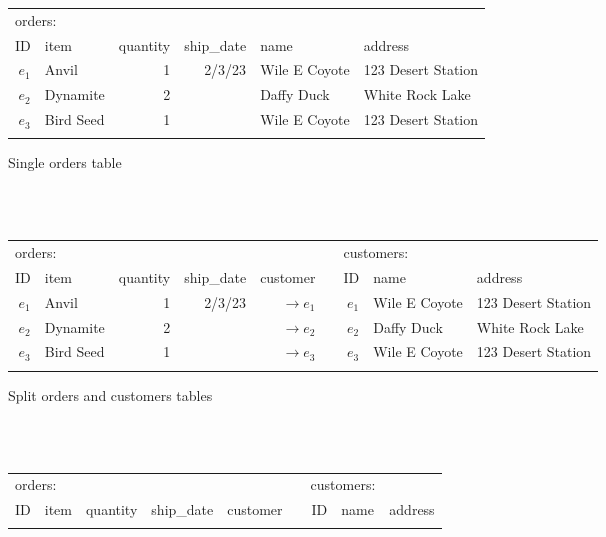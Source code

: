 \documentclass[english,submission]{programming}
\theoremstyle{definition}
\begin{document}
\begin{figure}
  \vspace{-8pt}
\begin{subfigure}[b]{35em}\vspace{0pt}
  \sffamily
  \small
  \begin{tabular}{ r|l|r|r|l|l|}
  \multicolumn{2}{l}{orders:}\\
     \hhline{~-----}
     ID & item & quantity & ship\_date & name & address \\
     \hhline{~=====}

     $e_1$ & Anvil & 1 & 2/3/23 & Wile E Coyote & 123 Desert Station \\
     \hhline{~-----}
     $e_2$ & Dynamite & 2 & & Daffy Duck & White Rock Lake \\
     \hhline{~-----}
     $e_3$ & Bird Seed & 1 & & Wile E Coyote & 123 Desert Station \\
     \hhline{~-----}
  \end{tabular}
  \caption{Single orders table}
  \label{fig:tables-single}
\end{subfigure}
\\[-0.5em]~\\
\begin{subfigure}[b]{40em}\vspace{0pt}
  \sffamily
  \small
  \begin{tabular}{ r|l|r|r|r|cr|l|l|}
  \multicolumn{2}{l}{orders:}&\multicolumn{4}{l}{}&\multicolumn{2}{l}{customers:}\\
     \hhline{~----~~--}
     ID & item & quantity & ship\_date & customer && ID & name & address \\
     \hhline{~====~~==}

     $e_1$ & Anvil & 1 & 2/3/23 & $\rightarrow\!e_1$ && $e_1$ & Wile E Coyote & 123 Desert Station \\
     \hhline{~----~~--}
     $e_2$ & Dynamite & 2 & & $\rightarrow\!e_2$ && $e_2$ & Daffy Duck & White Rock Lake \\
     \hhline{~----~~--}
     $e_3$ & Bird Seed & 1 & & $\rightarrow\!e_3$ && $e_3$ & Wile E Coyote & 123 Desert Station \\
     \hhline{~----~~--}
  \end{tabular}
  \caption{Split orders and customers tables}
  \label{fig:tables-split}
\end{subfigure}
\\[-0.5em]~\\
\begin{subfigure}[b]{40em}\vspace{0pt}
  \sffamily
  \small
  \begin{tabular}{ r|l|r|r|r|cr|l|l|}
  \multicolumn{2}{l}{orders:}&\multicolumn{4}{l}{}&\multicolumn{2}{l}{customers:}\\
     \hhline{~----~~--}
     ID & item & quantity & ship\_date & customer && ID & name & address \\
     \hhline{~====~~==}


\end{tabular}
\end{subfigure}
\end{figure}
\end{document}
